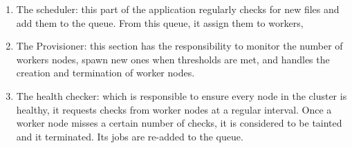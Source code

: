 \documentclass[a4paper]{IEEEtran}
\begin{document}
\begin{enumerate}
\item
The scheduler:
this part of the application regularly checks for new files and add them to the queue.
From this queue, it assign them to workers,
\item
The Provisioner:
this section has the responsibility to monitor the number of workers nodes, spawn new ones when thresholds are met, and handles the creation and termination of worker nodes.
\item
The health checker:
which is responsible to ensure every node in the cluster is healthy, it requests checks from worker nodes at a regular interval.
Once a worker node misses a certain number of checks, it is considered to be tainted and it terminated.
Its jobs are re-added to the queue.
\end{enumerate}
\end{document}
